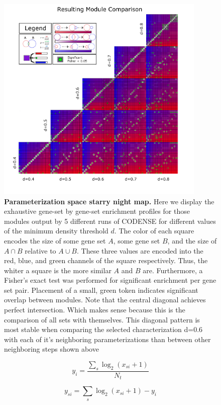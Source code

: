 \documentclass[10pt,letterpaper]{article}
\begin{document}
\begin{figure}[h]
\centering
\includegraphics[width=100mm]{Figures/moduleStaryNight2}
\caption{\textbf{Parameterization space starry night map.} Here we display the exhaustive gene-set by gene-set enrichment profiles for those modules output by 5 different runs of CODENSE for different values of the minimum density threshold $d$. The color of each square encodes the size of some gene set $A$, some gene set $B$, and the size of $A\cap{}B$ relative to $A\cup{}B$. These three values are encoded into the red, blue, and green channels of the square respectively. Thus, the whiter a square is the more similar $A$ and $B$ are. Furthermore, a Fisher's exact test was performed for significant enrichment per gene set pair. Placement of a small, green token indicates significant overlap between modules. 
Note that the central diagonal achieves perfect intersection. Which makes sense because this is the comparison of all sets with themselves. This diagonal pattern is most stable when comparing the selected characterization d=0.6 with each of it's neighboring parameterizations than between other neighboring steps shown above}
\label{fig:starryNight1}
\end{figure}

\begin{equation}\label{equation1}
y_{i} = \frac{\sum_{s} \log_2(x_{si} + 1)} {N_t}
\end{equation}

\begin{equation}\label{equation2}
y_{si}=\sum_{s} \log_2(x_{si} + 1)-y_i
\end{equation}
\end{document}
